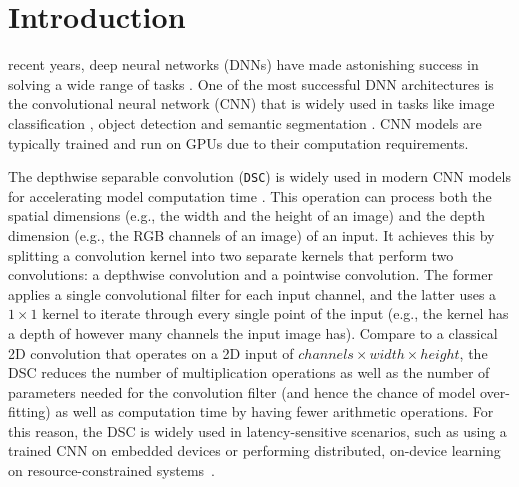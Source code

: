 \section{Introduction\label{sec:intro}}

 recent years, deep neural networks (DNNs) have made astonishing success in solving a wide range of tasks \cite{zoran2020towards,yang2020gated,wang2020rdsnet,chen2020mnasfpn,zhong2020squeeze,tokunaga2019adaptive}. One of the
most successful DNN architectures is the convolutional neural network (CNN) that is widely used in tasks like image classification
\cite{zoran2020towards,yang2020gated}, object detection \cite{wang2020rdsnet,chen2020mnasfpn} and  semantic segmentation \cite{zhong2020squeeze,tokunaga2019adaptive}. CNN models are typically trained and run on
GPUs due to their computation requirements.


The depthwise separable convolution (\texttt{DSC}) is widely used in modern CNN models for accelerating model computation time
\cite{howard2019searching,tan2019efficientnet,haase2020rethinking,zhang2019depth}. This operation can process both the spatial dimensions (e.g., the width and the height of an image) and the depth
dimension (e.g., the RGB channels of an image) of an input. It achieves this by splitting a convolution kernel into two separate kernels
that perform two convolutions: a depthwise convolution and a pointwise convolution. The former applies a single convolutional filter for
each input channel, and the latter uses a $1 \times 1$ kernel to iterate through every single point of the input (e.g., the kernel has a
depth of however many channels the input image has). Compare to a classical 2D convolution that operates on a 2D input of
$channels \times width \times height$, the DSC reduces the number of multiplication operations as well as the number of parameters needed
for the convolution filter (and hence the chance of model over-fitting) as well as computation time by having fewer arithmetic operations.
For this reason, the DSC is widely used in latency-sensitive scenarios, such as using a trained CNN on embedded devices or performing
distributed, on-device learning on resource-constrained systems~\cite{espeholt2019seed}.


